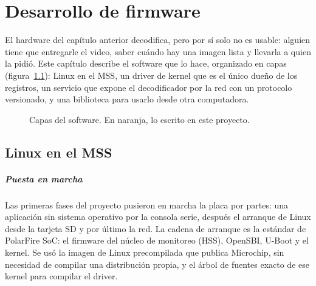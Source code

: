 \chapter{Desarrollo de firmware}
\label{cap:firmware}

El hardware del capítulo anterior decodifica, pero por sí solo no es usable:
alguien tiene que entregarle el video, saber cuándo hay una imagen lista y
llevarla a quien la pidió. Este capítulo describe el software que lo hace,
organizado en capas (figura~\ref{fig:capas-software}): Linux en el MSS, un
driver de kernel que es el único dueño de los registros, un servicio que
expone el decodificador por la red con un protocolo versionado, y una
biblioteca para usarlo desde otra computadora.

\begin{figure}[ht]
  \centering
  \caption{Capas del software. En naranja, lo escrito en este proyecto.}
  \label{fig:capas-software}
\end{figure}

\section{Linux en el MSS}
\label{sec:linux}

\paragraph{Puesta en marcha}
Las primeras fases del proyecto pusieron en marcha la placa por partes: una
aplicación sin sistema operativo por la consola serie, después el arranque
de Linux desde la tarjeta SD y por último la red. La cadena de arranque es la
estándar de PolarFire SoC: el firmware del núcleo de monitoreo (HSS), OpenSBI,
U-Boot y el kernel. Se usó la imagen de Linux precompilada que publica
Microchip, sin necesidad de compilar una distribución propia, y el árbol de
fuentes exacto de ese kernel para compilar el driver.

